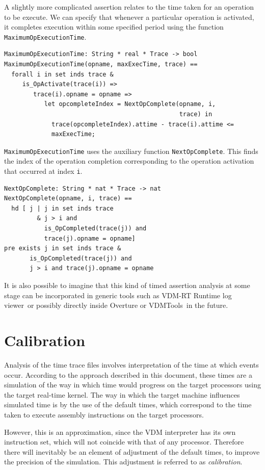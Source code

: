\documentclass{overturerepchap}
\newcommand{\vdmtools}{VDMTools}
\newcommand{\showtrace}{VDM-RT Runtime log viewer}
\begin{document}
A slightly more complicated assertion relates to the time taken for an
operation to be execute. We can specify that whenever a particular
operation is activated, it completes execution within some specified
period using the function \texttt{MaximumOpExecutionTime}.

\begin{lstlisting}
MaximumOpExecutionTime: String * real * Trace -> bool
MaximumOpExecutionTime(opname, maxExecTime, trace) ==
  forall i in set inds trace &
     is_OpActivate(trace(i)) =>
        trace(i).opname = opname =>
           let opcompleteIndex = NextOpComplete(opname, i,
                                                trace) in
             trace(opcompleteIndex).attime - trace(i).attime <= 
             maxExecTime;
\end{lstlisting}

\texttt{MaximumOpExecutionTime} uses the auxiliary function
\texttt{NextOpComplete}. This finds the index of the operation
completion corresponding to the operation activation that occurred at
index \texttt{i}.

\begin{lstlisting}
NextOpComplete: String * nat * Trace -> nat
NextOpComplete(opname, i, trace) ==
  hd [ j | j in set inds trace
         & j > i and
           is_OpCompleted(trace(j)) and 
           trace(j).opname = opname]
pre exists j in set inds trace & 
       is_OpCompleted(trace(j)) and
       j > i and trace(j).opname = opname
\end{lstlisting}

It is also possible to imagine that this kind of timed assertion analysis 
at some stage can be incorporated in generic tools such as 
\showtrace\ or possibly directly inside Overture or \vdmtools\ in the future.

\section{Calibration}

Analysis of the time trace files involves interpretation of the time
at which events occur.  According to the approach described in this
document, these times are a simulation of the way in which time would
progress on the target processors using the target real-time kernel. The
way in which the target machine influences simulated time is by the use
of the default times, which correspond to the time taken to execute
assembly instructions on the target processors.

However, this is an approximation, since the VDM interpreter has its
own instruction set, which will not coincide with that of any
processor. Therefore there will inevitably be an element of adjustment
of the default times, to improve the precision of the simulation. This
adjustment is referred to as \emph{calibration}.
\end{document}
